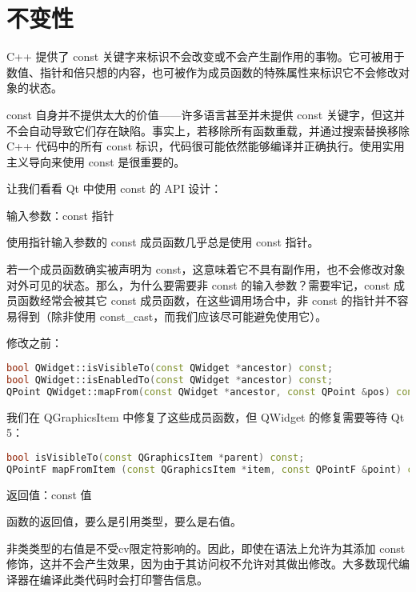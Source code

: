 \section{不变性}

C++ 提供了 const 关键字来标识不会改变或不会产生副作用的事物。它可被用于数值、指针和倍只想的内容，也可被作为成员函数的特殊属性来标识它不会修改对象的状态。

\begin{notice}
const 自身并不提供太大的价值——许多语言甚至并未提供 const 关键字，但这并不会自动导致它们存在缺陷。事实上，若移除所有函数重载，并通过搜索替换移除 C++ 代码中的所有 const 标识，代码很可能依然能够编译并正确执行。使用实用主义导向来使用 const 是很重要的。
\end{notice}

让我们看看 Qt 中使用 const 的 API 设计：

输入参数：const 指针

使用指针输入参数的 const 成员函数几乎总是使用 const 指针。

若一个成员函数确实被声明为 const，这意味着它不具有副作用，也不会修改对象对外可见的状态。那么，为什么要需要非 const 的输入参数？需要牢记，const 成员函数经常会被其它 const 成员函数，在这些调用场合中，非 const 的指针并不容易得到（除非使用 const\_cast，而我们应该尽可能避免使用它）。

修改之前：

\begin{lstlisting}[language=C++]
bool QWidget::isVisibleTo(const QWidget *ancestor) const;
bool QWidget::isEnabledTo(const QWidget *ancestor) const;
QPoint QWidget::mapFrom(const QWidget *ancestor, const QPoint &pos) const;
\end{lstlisting}

\begin{notice}
我们在 QGraphicsItem 中修复了这些成员函数，但 QWidget 的修复需要等待 Qt 5：
\end{notice}


\begin{lstlisting}[language=C++]
bool isVisibleTo(const QGraphicsItem *parent) const;
QPointF mapFromItem (const QGraphicsItem *item, const QPointF &point) const; 
\end{lstlisting}

返回值：const 值

函数的返回值，要么是引用类型，要么是右值。

非类类型的右值是不受cv限定符影响的。因此，即使在语法上允许为其添加 const 修饰，这并不会产生效果，因为由于其访问权不允许对其做出修改。大多数现代编译器在编译此类代码时会打印警告信息。

